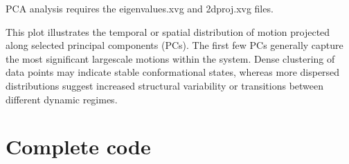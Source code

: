 \documentclass[a4paper,10pt,english]{sphinxmanual}
\let\sphinxpxdimen\pdfpxdimen\else\newdimen\sphinxpxdimen
\begin{document}
\sphinxAtStartPar
{} PCA analysis requires the eigenvalues.xvg and 2dproj.xvg files.

\begin{sphinxVerbatim}[commandchars=\\\{\}]
  
                
              
\end{sphinxVerbatim}

\noindent{\hspace*{\fill}\sphinxincludegraphics[width=600\sphinxpxdimen]{{PCA}.png}\hspace*{\fill}}

\sphinxAtStartPar
{} This plot illustrates the temporal or spatial distribution of motion projected along selected principal components (PCs). The first few PCs generally capture the most significant large\sphinxhyphen{}scale motions within the system. Dense clustering of data points may indicate stable conformational states, whereas more dispersed distributions suggest increased structural variability or transitions between different dynamic regimes.


\section{Complete code}
\label{\detokenize{PCA:complete-code}}
\begin{sphinxVerbatim}[commandchars=\\\{\}]
\end{sphinxVerbatim}

\begin{sphinxVerbatim}[commandchars=\\\{\}]
\end{sphinxVerbatim}
\end{document}

